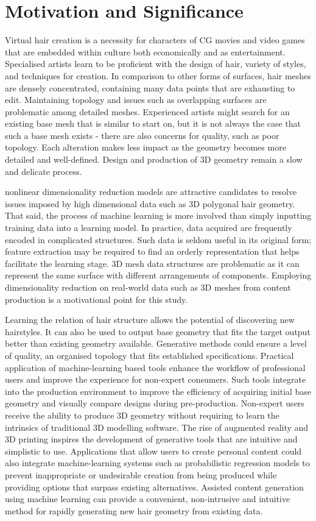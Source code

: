 \documentclass[ %
author={Dillon Keith Diep},
supervisor={Dr. Carl Henrik Ek},
degree={MEng},
title={ART-CG Hair:},
subtitle={Assisted Real-time Content Generation of Stylised Virtual Hair},
type={Research},
year={2017} ]{dissertation}
\begin{document}
	\section{Motivation and Significance}
	Virtual hair creation is a necessity for characters of CG movies and video games that are embedded within culture both economically and as entertainment. Specialised artists learn to be proficient with the design of hair, variety of styles, and techniques for creation. In comparison to other forms of surfaces, hair meshes are densely concentrated, containing many data points that are exhausting to edit. Maintaining topology and issues such as overlapping surfaces are problematic among detailed meshes. Experienced artists might search for an existing base mesh that is similar to start on, but it is not always the case that such a base mesh exists - there are also concerns for quality, such as poor topology. Each alteration makes less impact as the geometry becomes more detailed and well-defined. Design and production of 3D geometry remain a slow and delicate process.
	
	nonlinear dimensionality reduction models are attractive candidates to resolve issues imposed by high dimensional data such as 3D polygonal hair geometry. That said, the process of machine learning is more involved than simply inputting training data into a learning model. In practice, data acquired are frequently encoded in complicated structures. Such data is seldom useful in its original form; feature extraction may be required to find an orderly representation that helps facilitate the learning stage. 3D mesh data structures are problematic as it can represent the same surface with different arrangements of components. Employing dimensionality reduction on real-world data such as 3D meshes from content production is a motivational point for this study.
	
	Learning the relation of hair structure allows the potential of discovering new hairstyles.  It can also be used to output base geometry that fits the target output better than existing geometry available. Generative methods could ensure a level of quality, an organised topology that fits established specifications. Practical application of machine-learning based tools enhance the workflow of professional users and improve the experience for non-expert consumers. Such tools integrate into the production environment to improve the efficiency of acquiring initial base geometry and visually compare designs during pre-production. Non-expert users receive the ability to produce 3D geometry without requiring to learn the intrinsics of traditional 3D modelling software. The rise of augmented reality and 3D printing inspires the development of generative tools that are intuitive and simplistic to use. Applications that allow users to create personal content could also integrate machine-learning systems such as probabilistic regression models to prevent inappropriate or undesirable creation from being produced while providing options that surpass existing alternatives. Assisted content generation using machine learning can provide a convenient, non-intrusive and intuitive method for rapidly generating new hair geometry from existing data.
	
\end{document}
